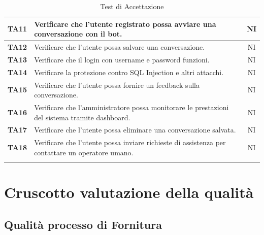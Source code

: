 \documentclass{article}
\begin{document}
\begin{longtable}{|>{\centering\arraybackslash}m{}|>{\raggedright\arraybackslash}m{}|c|}
    \hline
    \textbf{TA11} & Verificare che l’utente registrato possa avviare una conversazione con il bot.& NI\\
    \hline
    \textbf{TA12} & Verificare che l’utente possa salvare una conversazione.& NI\\
    \hline
    \textbf{TA13} & Verificare che il login con username e password funzioni.& NI\\
    \hline
    \textbf{TA14} & Verificare la protezione contro SQL Injection e altri attacchi. & NI\\
    \hline
    \textbf{TA15} & Verificare che l’utente possa fornire un feedback sulla conversazione. & NI\\
    \hline
    \textbf{TA16} & Verificare che l’amministratore possa monitorare le prestazioni del sistema tramite dashboard. & NI\\
    \hline
    \textbf{TA17} & Verificare che l’utente possa eliminare una conversazione salvata.& NI\\
    \hline
    \textbf{TA18} & Verificare che l’utente possa inviare richieste di assistenza per contattare un operatore umano.& NI\\
    \hline
    \caption{Test di Accettazione}
\end{longtable}


\section{Cruscotto valutazione della qualità}


    \subsection{Qualità processo di Fornitura}
\end{document}
